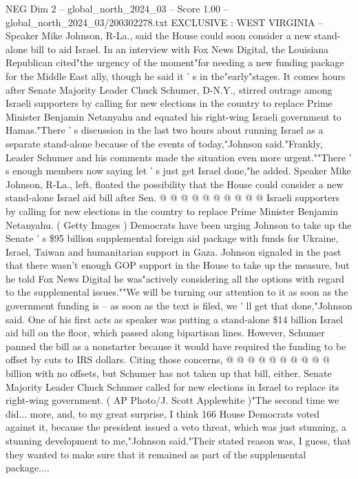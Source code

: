 \begin{textsample}{NEG Dim 2 – global\_north\_2024\_03 – Score 1.00 – global\_north\_2024\_03/200302278.txt}  \label{ex:f2_neg_342}
EXCLUSIVE : WEST VIRGINIA -- Speaker Mike Johnson, R-La., said the House could soon consider a new stand-alone bill to aid Israel.
In an interview with Fox News Digital, the Louisiana Republican cited"the urgency of the moment"for needing a new funding package for the Middle East ally, though he said it ' s in the"early"stages.
It comes hours after Senate Majority Leader Chuck Schumer, D-N.Y., stirred outrage among Israeli supporters by calling for new elections in the country to replace Prime Minister Benjamin Netanyahu and equated his right-wing Israeli government to Hamas."There ' s discussion in the last two hours about running Israel as a separate stand-alone because of the events of today,"Johnson said."Frankly, Leader Schumer and his comments made the situation even more urgent.""There ' s enough members now saying let ' s just get Israel done,"he added.
Speaker Mike Johnson, R-La., left, floated the possibility that the House could consider a new stand-alone Israel aid bill after Sen. @ @ @ @ @ @ @ @ @ @ Israeli supporters by calling for new elections in the country to replace Prime Minister Benjamin Netanyahu. ( Getty Images ) Democrats have been urging Johnson to take up the Senate ' s \$95 billion supplemental foreign aid package with funds for Ukraine, Israel, Taiwan and humanitarian support in Gaza.
Johnson signaled in the past that there wasn't enough GOP support in the House to take up the measure, but he told Fox News Digital he was"actively considering all the options with regard to the supplemental issues.""We will be turning our attention to it as soon as the government funding is -- as soon as the text is filed, we ' ll get that done,"Johnson said.
One of his first acts as speaker was putting a stand-alone \$14 billion Israel aid bill on the floor, which passed along bipartisan lines.
However, Schumer panned the bill as a nonstarter because it would have required the funding to be offset by cuts to IRS dollars.
Citing those concerns, @ @ @ @ @ @ @ @ @ @ billion with no offsets, but Schumer has not taken up that bill, either.
Senate Majority Leader Chuck Schumer called for new elections in Israel to replace its right-wing government. ( AP Photo/J.
Scott Applewhite )"The second time we did... more, and, to my great surprise, I think 166 House Democrats voted against it, because the president issued a veto threat, which was just stunning, a stunning development to me,"Johnson said."Their stated reason was, I guess, that they wanted to make sure that it remained as part of the supplemental package....

\end{textsample}
